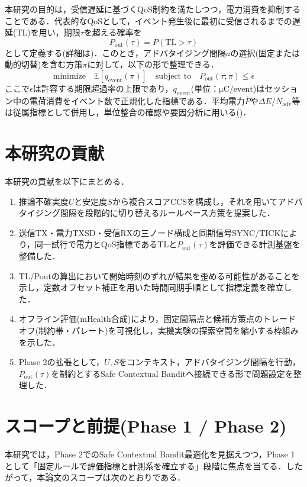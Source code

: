 本研究の目的は，受信遅延に基づくQoS制約を満たしつつ，電力消費を抑制することである．代表的なQoSとして，イベント発生後に最初に受信されるまでの遅延(TL)を用い，期限$\tau$を超える確率を
\begin{equation}
  P_{\mathrm{out}}(\tau)=P(\mathrm{TL}>\tau)
\end{equation}
として定義する(詳細は)．このとき，アドバタイジング間隔$a$の選択(固定または動的切替)を含む方策$\pi$に対して，以下の形で整理できる．
\begin{equation}
  \text{minimize}\quad \mathbb{E}[q_{\mathrm{event}}(\pi)]
  \quad \text{subject to}\quad P_{\mathrm{out}}(\tau;\pi)\le \epsilon
\end{equation}
ここで$\epsilon$は許容する期限超過率の上限であり，$q_{\mathrm{event}}$(単位：$\si{\micro\coulomb}/\text{event}$)はセッション中の電荷消費をイベント数で正規化した指標である．平均電力$\overline{P}$や$\Delta E/N_{\mathrm{adv}}$等は従属指標として併用し，単位整合の確認や要因分析に用いる()．

\section{本研究の貢献}
本研究の貢献を以下にまとめる．
\begin{enumerate}
  \item 推論不確実度$U$と安定度$S$から複合スコアCCSを構成し，それを用いてアドバタイジング間隔を段階的に切り替えるルールベース方策を提案した．
\item 送信TX・電力TXSD・受信RXの三ノード構成と同期信号SYNC/TICKにより，同一試行で電力とQoS指標であるTLと$P_{\mathrm{out}}(\tau)$を評価できる計測基盤を整備した．
  \item TL/Poutの算出において開始時刻のずれが結果を歪める可能性があることを示し，定数オフセット補正を用いた時間同期手順として指標定義を確立した．
  \item オフライン評価(mHealth合成)により，固定間隔点と候補方策点のトレードオフ(制約帯・パレート)を可視化し，実機実験の探索空間を縮小する枠組みを示した．
  \item Phase 2の拡張として，$U,S$をコンテキスト，アドバタイジング間隔を行動，$P_{\mathrm{out}}(\tau)$を制約とするSafe Contextual Banditへ接続できる形で問題設定を整理した．
\end{enumerate}

\section{スコープと前提(Phase 1 / Phase 2)}
本研究では，Phase 2でのSafe Contextual Bandit最適化を見据えつつ，Phase 1として「固定ルールで評価指標と計測系を確立する」段階に焦点を当てる．したがって，本論文のスコープは次のとおりである．

